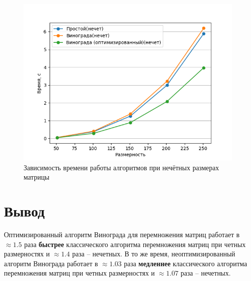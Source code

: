 \begin{figure}[!h]
	\centering
	\includegraphics[scale=0.6]{imgs/2.png}
	\caption{Зависимость времени работы алгоритмов при нечётных размерах матрицы}
	\label{img:profiling2}
\end{figure}

\clearpage

\section{Вывод}

Оптимизированный алгоритм Винограда для перемножения матриц работает в $ \approx 1.5 $ раза \textbf{быстрее} классического 
алгоритма перемножения матриц при четных размерностях и $ \approx 1.4 $ раза -- нечетных.
В то же время, неоптимизированный алгоритм Винограда работает в $ \approx 1.03 $ раза \textbf{медленнее} классического 
алгоритма перемножения матриц при четных размерностях и $ \approx 1.07 $ раза -- нечетных.
